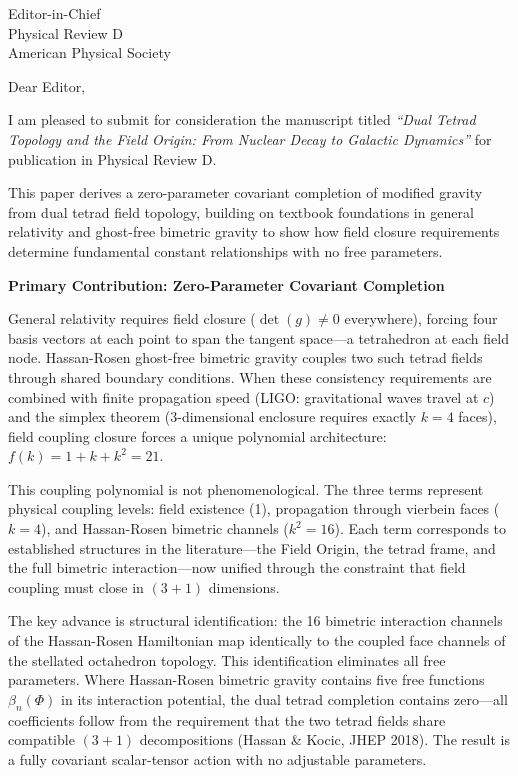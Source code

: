 \documentclass[11pt]{letter}
\begin{document}
\begin{letter}{%
Editor-in-Chief\\
Physical Review D\\
American Physical Society
}

\opening{Dear Editor,}

I am pleased to submit for consideration the manuscript titled \textit{``Dual Tetrad Topology and the Field Origin: From Nuclear Decay to Galactic Dynamics''} for publication in Physical Review D.

This paper derives a zero-parameter covariant completion of modified gravity from dual tetrad field topology, building on textbook foundations in general relativity and ghost-free bimetric gravity to show how field closure requirements determine fundamental constant relationships with no free parameters.

\textbf{Primary Contribution: Zero-Parameter Covariant Completion}

General relativity requires field closure ($\det(g) \neq 0$ everywhere), forcing four basis vectors at each point to span the tangent space—a tetrahedron at each field node. Hassan-Rosen ghost-free bimetric gravity couples two such tetrad fields through shared boundary conditions. When these consistency requirements are combined with finite propagation speed (LIGO: gravitational waves travel at $c$) and the simplex theorem (3-dimensional enclosure requires exactly $k = 4$ faces), field coupling closure forces a unique polynomial architecture: $f(k) = 1 + k + k^2 = 21$.

This coupling polynomial is not phenomenological. The three terms represent physical coupling levels: field existence (1), propagation through vierbein faces ($k = 4$), and Hassan-Rosen bimetric channels ($k^2 = 16$). Each term corresponds to established structures in the literature—the Field Origin, the tetrad frame, and the full bimetric interaction—now unified through the constraint that field coupling must close in $(3+1)$ dimensions.

The key advance is structural identification: the 16 bimetric interaction channels of the Hassan-Rosen Hamiltonian map identically to the coupled face channels of the stellated octahedron topology. This identification eliminates all free parameters. Where Hassan-Rosen bimetric gravity contains five free functions $\beta_n(\Phi)$ in its interaction potential, the dual tetrad completion contains zero—all coefficients follow from the requirement that the two tetrad fields share compatible $(3+1)$ decompositions (Hassan \& Kocic, JHEP 2018). The result is a fully covariant scalar-tensor action with no adjustable parameters.


\end{letter}
\end{document}
